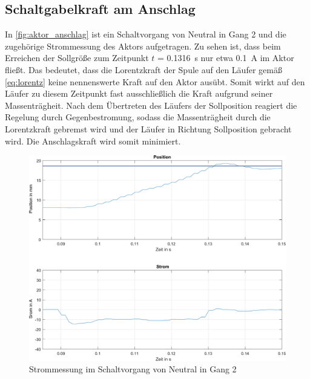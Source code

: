 \subsection{Schaltgabelkraft am Anschlag}\label{schaltgabelkraft}
In \autoref{fig:aktor_anschlag} ist ein Schaltvorgang von Neutral in Gang 2 und die zugehörige Strommessung des Aktors aufgetragen. Zu sehen ist, dass beim Erreichen der Sollgröße zum Zeitpunkt $t$ = \SI{0,1316}{s} nur etwa \SI{0,1}{A} im Aktor fließt. Das bedeutet, dass die Lorentzkraft der Spule auf den Läufer gemäß \autoref{eq:lorentz} keine nennenswerte Kraft auf den Aktor ausübt. Somit wirkt auf den Läufer zu diesem Zeitpunkt fast ausschließlich die Kraft aufgrund seiner Massenträgheit. Nach dem Übertreten des Läufers der Sollposition reagiert die Regelung durch Gegenbestromung, sodass die Massenträgheit durch die Lorentzkraft gebremst wird und der Läufer in Richtung Sollposition gebracht wird. Die Anschlagskraft wird somit minimiert.

\begin{figure} [h]
	\centering
	\includegraphics[width=1\linewidth]{Bilder/aktor_anschlag2.pdf}
	\caption{Strommessung im Schaltvorgang von Neutral in Gang 2}
	\label{fig:aktor_anschlag}
\end{figure}
